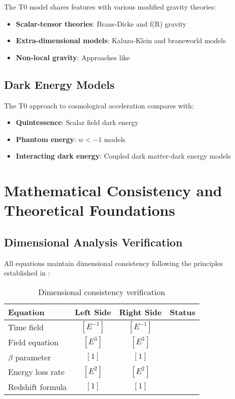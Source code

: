 \documentclass[12pt,a4paper]{article}
\begin{document}
	The T0 model shares features with various modified gravity theories:
	
	\begin{itemize}
		\item \textbf{Scalar-tensor theories}: Brans-Dicke \citep{brans1961} and f(R) gravity \citep{sotiriou2010}
		\item \textbf{Extra-dimensional models}: Kaluza-Klein \citep{kaluza1921,klein1926} and braneworld models \citep{randall1999}
		\item \textbf{Non-local gravity}: Approaches like \citep{woodard2007,koivisto2008}
	\end{itemize}
	
	\subsection{Dark Energy Models}
	\label{subsec:dark_energy_models}
	
	The T0 approach to cosmological acceleration compares with:
	\begin{itemize}
		\item \textbf{Quintessence}: Scalar field dark energy \citep{caldwell1998,steinhardt1999}
		\item \textbf{Phantom energy}: $w < -1$ models \citep{caldwell2003}
		\item \textbf{Interacting dark energy}: Coupled dark matter-dark energy models \citep{amendola2000}
	\end{itemize}
	
	\section{Mathematical Consistency and Theoretical Foundations}
	\label{sec:mathematical_consistency}
	
	\subsection{Dimensional Analysis Verification}
	\label{subsec:dimensional_verification}
	
	All equations maintain dimensional consistency following the principles established in \citep{barenblatt1996,bridgman1922}:
	
	\begin{table}[htbp]
		\centering
		\begin{tabular}{lccl}
			\toprule
			\textbf{Equation} & \textbf{Left Side} & \textbf{Right Side} & \textbf{Status} \\
			\midrule
			Time field & $[E^{-1}]$ & $[E^{-1}]$ & \checkmark \\
			Field equation & $[E^3]$ & $[E^3]$ & \checkmark \\
			$\beta$ parameter & $[1]$ & $[1]$ & \checkmark \\
			Energy loss rate & $[E^2]$ & $[E^2]$ & \checkmark \\
			Redshift formula & $[1]$ & $[1]$ & \checkmark \\
			\bottomrule
		\end{tabular}
		\caption{Dimensional consistency verification}
		\label{tab:dimensional_check}
	\end{table}
	
\end{document}
